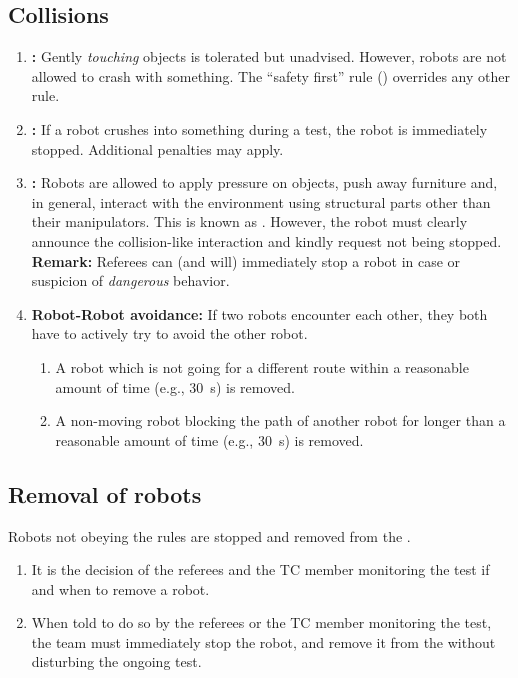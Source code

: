 \subsection{Collisions}
\begin{enumerate}
	\item \textbf{:} Gently \emph{touching} objects is tolerated but unadvised.
	However, robots are not allowed to crash with something.
	The \enquote{safety first} rule () overrides any other rule.

	\item \textbf{:} If a robot crushes into something during a test, the robot is immediately stopped.	Additional penalties may apply.

	\item \textbf{:} Robots are allowed to apply pressure on objects, push away furniture and, in general, interact with the environment using structural parts other than their manipulators.
	This is known as .
	However, the robot must clearly announce the collision-like interaction and kindly request not being stopped.\\
	\textbf{Remark: } Referees can (and will) immediately stop a robot in case or suspicion of \emph{dangerous} behavior.

	\item \textbf{Robot-Robot avoidance:} If two robots encounter each other, they both have to actively try to avoid the other robot.
	\begin{enumerate}
		\item A robot which is not going for a different route within a reasonable amount of time (e.g., \SI{30}{\second}) is removed.
		\item A non-moving robot blocking the path of another robot for longer than a reasonable amount of time (e.g., \SI{30}{\second}) is removed.
	\end{enumerate}
\end{enumerate}



\subsection{Removal of robots}
\label{rule:robot_removal}
Robots not obeying the rules are stopped and removed from the \Arena{}.
\begin{enumerate}
	\item It is the decision of the referees and the TC member monitoring the test if and when to remove a robot.

	\item When told to do so by the referees or the TC member monitoring the test, the team must immediately stop the robot, and remove it from the \Arena{} without disturbing the ongoing test.

\end{enumerate}


